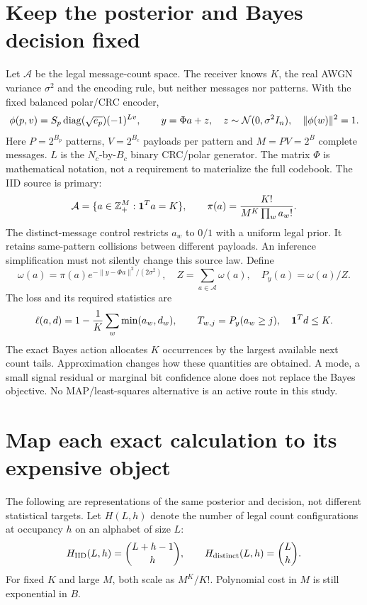 \documentclass[10pt,a4paper]{article}
\begin{document}
\section{Keep the posterior and Bayes decision fixed}
Let $\mathcal A$ be the legal message-count space. The receiver knows $K$, the real AWGN variance $\sigma^2$
and the encoding rule, but neither messages nor patterns. With the fixed balanced polar/CRC encoder,
\[
 \phi(p,v)=S_p\operatorname{diag}(\sqrt{e_p})(-1)^{Lv},\qquad
 y=\Phi a+z,\quad z\sim\mathcal N(0,\sigma^2I_n),\quad \|\phi(w)\|^2=1.
\]
Here $P=2^{B_p}$ patterns, $V=2^{B_c}$ payloads per pattern and $M=PV=2^B$ complete messages.
$L$ is the $N_c$-by-$B_c$ binary CRC/polar generator. The matrix $\Phi$ is mathematical notation, not a
requirement to materialize the full codebook. The IID source is primary:
\[
 \mathcal A=\{a\in\mathbb Z_+^M:\mathbf{1}^Ta=K\},\qquad
 \pi(a)=\frac{K!}{M^K\prod_w a_w!}.
\]
The distinct-message control restricts $a_w$ to $0/1$ with a uniform legal prior. It retains same-pattern
collisions between different payloads. An inference simplification must not silently change this source law.
Define
\begin{equation}
 \omega(a)=\pi(a)e^{-\|y-\Phi a\|^2/(2\sigma^2)},\quad
 Z=\sum_{a\in\mathcal A}\omega(a),\quad P_y(a)=\omega(a)/Z.
 \label{eq:target}
\end{equation}
The loss and its required statistics are
\begin{equation}
 \ell(a,d)=1-\frac1K\sum_w\min(a_w,d_w),\qquad
 T_{w,j}=P_y(a_w\geq j),\quad \mathbf{1}^Td\leq K.
 \label{eq:loss-target}
\end{equation}
The exact Bayes action allocates $K$ occurrences by the largest available next count tails. Approximation
changes how these quantities are obtained. A mode, a small signal residual or marginal bit confidence alone
does not replace the Bayes objective. No MAP/least-squares alternative is an active route in this study.

\section{Map each exact calculation to its expensive object}
The following are representations of the same posterior and decision, not different statistical targets.
Let $H(L,h)$ denote the number of legal count configurations at occupancy $h$ on an alphabet of size $L$:
\[
 H_{\rm IID}(L,h)=\binom{L+h-1}{h},\qquad H_{\rm distinct}(L,h)=\binom Lh.
\]
For fixed $K$ and large $M$, both scale as $M^K/K!$. Polynomial cost in $M$ is still exponential in $B$.
\end{document}
